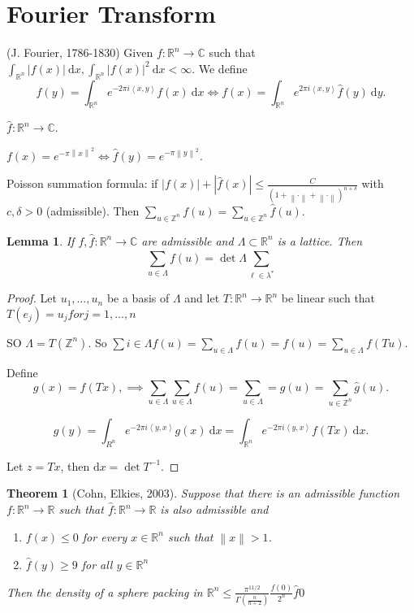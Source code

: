 \documentclass{report}
\newcommand{\R}{\mathbb{R}}
\newcommand{\C}{\mathbb{C}}
\newcommand{\Z}{\mathbb{Z}}
\newcommand{\df}{\mathrm{d}}
\newcommand{\idf}{\ \mathrm{d}}
\newcommand{\inner}[2]{\left\langle #1, #2\right\rangle}
\newcommand{\norm}[1]{\left\| #1 \right\|}
\newcommand{\abs}[1]{\left| #1 \right|}
\newtheorem{theorem}{Theorem}[section]
\newtheorem{lemma}{Lemma}[section]
\theoremstyle{definition}
\theoremstyle{remark}
\numberwithin{equation}{section}
\begin{document}
\section{Fourier Transform}
(J. Fourier, 1786-1830)
Given $f: \R^n \to \C$ such that $\int_{\R^n} |f(x)| \idf x, \int_{\R^n} |f(x)|^2 \idf x < \infty$. We define \[\widehat{f}(y)=\int_{\R^n} e^{-2\pi i \inner{x}{y}}f(x) \idf x \iff f(x) = \int_{\R^n}e^{2\pi i \inner{x}{y}} \widehat{f}(y) \idf y.\]

$\widehat{f}: \R^n \to \C$.

$f(x) = e^{-\pi\norm{x}^2} \iff \widehat{f}(y) = e^{-\pi\norm{y}^2}$.

Poisson summation formula: if $|f(x)| + \abs{\widehat{f}(x)} \leq \frac{C}{(1 + \norm{\cdot} + \norm{\cdot})^{n + \delta}}$ with $c, \delta > 0$ (admissible). Then $\sum_{u \in \Z^n} f(u) = \sum_{u \in \Z^n}\widehat{f}(u)$.

\begin{lemma}
    If $f, \widehat{f}: \R^n \to \C$ are admissible and $\Lambda \subset \R^n$ is a lattice. Then \[\sum_{u\in \Lambda}^{}f(u) = \det \Lambda \sum_{\ell \in \lambda^*}^{}\]
\end{lemma}
\begin{proof}
    Let $u_1, \ldots, u_n$ be a basis of $\Lambda$ and let $T: \R^n \to \R^n$ be linear such that $T(e_j) = u_j for j = 1, \ldots, n$

    SO $\Lambda = T(\Z^n)$. So $\sum i \in \Lambda f(u) = \sum_{u \in \Lambda} f(u) = f(u) = \sum_{u \in \Lambda} f(Tu)$.
    
    Define \[g(x) = f(Tx), \implies \sum_{u \in \Lambda} \sum_{u \in \Lambda} f(u) = \sum_{u \in \Lambda} = g(u) = \sum_{u \in \Z^n} \widehat{g}(u).\]

    \[\widehat{g}(y) = \int_{R^n} e^{-2\pi i \inner{y}{x}} g(x) \idf x = \int_{\R^n} e^{-2\pi i \inner{y}{x}}f(Tx)\idf x.\]

    Let $z = Tx$, then $\df x = \det T^{-1}$.


\end{proof}

\begin{theorem}[Cohn, Elkies, 2003]
    Suppose that there is an admissible function $f: \R^n \to \R$ such that $\widehat{f}: \R^n \to \R$ is also admissible and \begin{enumerate}
        \item $f(x) \leq 0$ for every $x \in \R^n$ such that $\norm{x} > 1$.
        \item $\widehat{f}(y) \geq 9$ for all $y \in \R^n$
    \end{enumerate}
    Then the density of a sphere packing in $\R^n \leq \frac{\pi^{11/2}}{\Gamma\left(\frac{n}{n+2}\right)}\frac{f(0)}{2^n} \widehat{f}{0}$
\end{theorem}
\end{document}
